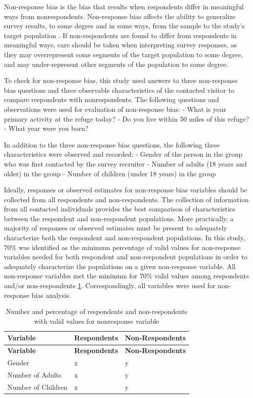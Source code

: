 \documentclass[]{book}
\begin{document}
Non-response bias is the bias that results when respondents differ in
meaningful ways from nonrespondents. Non-response bias affects the
ability to generalize survey results, to some degree and in some ways,
from the sample to the study's target population
\citep[\citet{salant1994}]{dillman2014}. If non-respondents are found to
differ from respondents in meaningful ways, care should be taken when
interpreting survey responses, as they may overrepresent some segments
of the target population to some degree, and may under-represent other
segments of the population to some degree.

To check for non-response bias, this study used answers to three
non-response bias questions and three observable characteristics of the
contacted visitor to compare respondents with nonrespondents. The
following questions and observations were used for evaluation of
non-response bias: - What is your primary activity at the refuge today?
- Do you live within 50 miles of this refuge? - What year were you born?

In addition to the three non-response bias questions, the following
three characteristics were observed and recorded: - Gender of the person
in the group who was first contacted by the survey recruiter - Number of
adults (18 years and older) in the group - Number of children (under 18
years) in the group

Ideally, responses or observed estimates for non-response bias variables
should be collected from all respondents and non-respondents. The
collection of information from all contacted individuals provides the
best comparison of characteristics between the respondent and
non-respondent populations. More practically, a majority of responses or
observed estimates must be present to adequately characterize both the
respondent and non-respondent populations. In this study, 70\% was
identified as the minimum percentage of valid values for non-response
variables needed for both respondent and non-respondent populations in
order to adequately characterize the populations on a given non-response
variable. All non-response variables met the minimum for 70\% valid
values among respondents and/or non-respondents \ref{tab:nonresponse}.
Correspondingly, all variables were used for non-response bias analysis.

\begin{longtable}[]{@{}lll@{}}
\caption{\label{tab:nonresponse} Number and percentage of respondents and
non-respondents with valid values for nonresponse
variable}\tabularnewline
\toprule
\textbf{Variable} & \textbf{Respondents} &
\textbf{Non-Respondents}\tabularnewline
\midrule
\endfirsthead
\toprule
\textbf{Variable} & \textbf{Respondents} &
\textbf{Non-Respondents}\tabularnewline
\midrule
\endhead
Gender & x & y\tabularnewline
Number of Adults & x & y\tabularnewline
Number of Children & x & y\tabularnewline
\bottomrule
\end{longtable}
\end{document}
